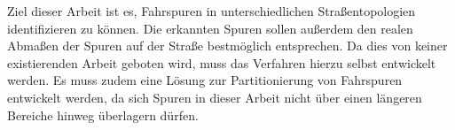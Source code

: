 Ziel dieser Arbeit ist es, Fahrspuren in unterschiedlichen Straßentopologien identifizieren zu können.
Die erkannten Spuren sollen außerdem den realen Abmaßen der Spuren auf der Straße bestmöglich entsprechen.
Da dies von keiner existierenden Arbeit geboten wird, muss das Verfahren hierzu selbst entwickelt werden.
Es muss zudem eine Lösung zur Partitionierung von Fahrspuren entwickelt werden, da sich Spuren
in dieser Arbeit nicht über einen längeren Bereiche hinweg überlagern dürfen.


